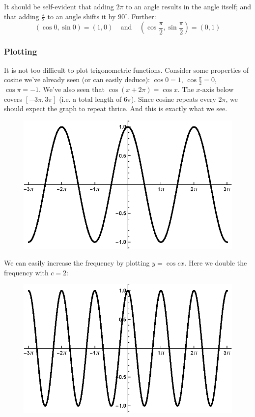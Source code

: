 \vs

It should be self-evident that adding $2\pi$ to an angle results in the
angle itself; and that adding $\frac{\pi}{2}$ to an angle shifts it by
$90^{\circ}$. Further:
\[(\cos 0,\sin 0)=(1,0)\ \ \ \ \ \text{and}\ \ \ \ \ (\cos \frac{\pi}{2},\sin \frac{\pi}{2})=(0,1)\]

\clearpage
\subsubsection*{Plotting}
It is not too difficult to plot trigonometric functions. Consider some
properties of cosine we've already seen (or can easily deduce):
$\cos 0=1$, $\cos \frac{\pi}{2}=0$, $\cos \pi=-1$. We've also seen that
$\cos{(x+2\pi)}=\cos x$. The $x$-axis below covers $[-3\pi, 3\pi]$ (i.e. a
total length of $6\pi$). Since cosine repeats every $2\pi$, we should
expect the graph to repeat thrice. And this is exactly what we see.
\begin{figure}[htbp]
  \centering
  \includegraphics[width=.75\textwidth]{eps/prereqs/cosine.eps}
\end{figure}

We can easily increase the frequency by plotting $y=\cos cx$. Here we
double the frequency with $c=2$:
\begin{figure}[htbp]
  \centering
  \includegraphics[width=.75\textwidth]{eps/prereqs/cosine2x.eps}
\end{figure}

